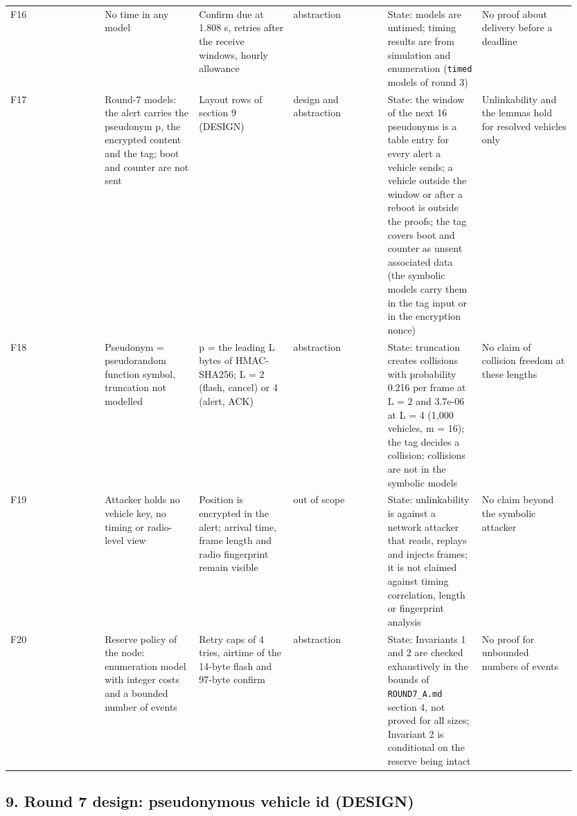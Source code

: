 {\begin{longtable}{p{0.158\linewidth}p{0.158\linewidth}p{0.158\linewidth}p{0.158\linewidth}p{0.158\linewidth}p{0.158\linewidth}}
F16 & No time in any model & Confirm due at 1.808 s, retries after the receive windows, hourly allowance & abstraction & State: models are untimed; timing results are from simulation and enumeration (\texttt{timed} models of round 3) & No proof about delivery before a deadline \\
F17 & Round-7 models: the alert carries the pseudonym p, the encrypted content and the tag; boot and counter are not sent & Layout rows of section 9 (DESIGN) & design and abstraction & State: the window of the next 16 pseudonyms is a table entry for every alert a vehicle sends; a vehicle outside the window or after a reboot is outside the proofs; the tag covers boot and counter as unsent associated data (the symbolic models carry them in the tag input or in the encryption nonce) & Unlinkability and the lemmas hold for resolved vehicles only \\
F18 & Pseudonym = pseudorandom function symbol, truncation not modelled & p = the leading L bytes of HMAC-SHA256; L = 2 (flash, cancel) or 4 (alert, ACK) & abstraction & State: truncation creates collisions with probability 0.216 per frame at L = 2 and 3.7e-06 at L = 4 (1,000 vehicles, m = 16); the tag decides a collision; collisions are not in the symbolic models & No claim of collision freedom at these lengths \\
F19 & Attacker holds no vehicle key, no timing or radio-level view & Position is encrypted in the alert; arrival time, frame length and radio fingerprint remain visible & out of scope & State: unlinkability is against a network attacker that reads, replays and injects frames; it is not claimed against timing correlation, length or fingerprint analysis & No claim beyond the symbolic attacker \\
F20 & Reserve policy of the node: enumeration model with integer costs and a bounded number of events & Retry caps of 4 tries, airtime of the 14-byte flash and 97-byte confirm & abstraction & State: Invariants 1 and 2 are checked exhaustively in the bounds of \texttt{ROUND7\_A.md} section 4, not proved for all sizes; Invariant 2 is conditional on the reserve being intact & No proof for unbounded numbers of events \\
\bottomrule
\end{longtable}}

\subsection*{9. Round 7 design: pseudonymous vehicle id (DESIGN)}

